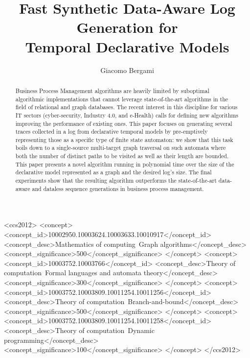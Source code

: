 \documentclass[sigconf]{acmart}
\begin{document}
	\title[Fast Synthetic Data-Aware Log Generation for Temporal Declarative Models]{Fast Synthetic Data-Aware Log Generation for\\ Temporal Declarative Models}

\author{Giacomo Bergami}


\begin{abstract}
Business Process Management algorithms are heavily limited by suboptimal algorithmic implementations that cannot leverage state-of-the-art algorithms in the field of relational and graph databases. The recent interest in this discipline for various IT sectors (cyber-security, Industry 4.0, and e-Health) calls for defining new algorithms  improving the performance of existing ones. This paper focuses on generating several traces collected in a log from declarative temporal models by pre-emptively representing those as a specific type of finite state automaton: we show that this task boils down to a single-source multi-target graph traversal on such automata where both the number of distinct paths to be visited as well as their length are bounded. This paper presents a novel algorithm running in polynomial time over the size of the declarative model represented as a graph and the desired log's size. The final experiments show that the resulting algorithm outperforms the state-of-the-art data-aware and dataless sequence generations in business process management.
\end{abstract}


\begin{CCSXML}
<ccs2012>
   <concept>
       <concept_id>10002950.10003624.10003633.10010917</concept_id>
       <concept_desc>Mathematics of computing~Graph algorithms</concept_desc>
       <concept_significance>500</concept_significance>
       </concept>
   <concept>
       <concept_id>10003752.10003766</concept_id>
       <concept_desc>Theory of computation~Formal languages and automata theory</concept_desc>
       <concept_significance>300</concept_significance>
       </concept>
   <concept>
       <concept_id>10003752.10003809.10011254.10011256</concept_id>
       <concept_desc>Theory of computation~Branch-and-bound</concept_desc>
       <concept_significance>500</concept_significance>
       </concept>
   <concept>
       <concept_id>10003752.10003809.10011254.10011258</concept_id>
       <concept_desc>Theory of computation~Dynamic programming</concept_desc>
       <concept_significance>100</concept_significance>
       </concept>
 </ccs2012>
\end{CCSXML}
\end{document}
